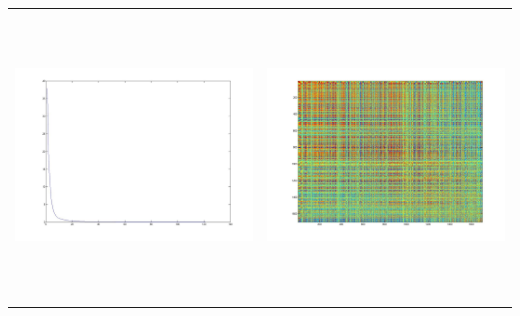 \begin{tabular}[IWM Correlation Matrix and corresponding eigenvalue
distribution.]{ |c|c| }
\includegraphics[width=3in,height=3in]{images/RealTimeFinancialTSMining/iwm_day_pca_eigen_var_desc.jpg} &
\includegraphics[width=3in,height=3in]{images/RealTimeFinancialTSMining/iwm_day_price_corr.jpg}
\end{tabular}


